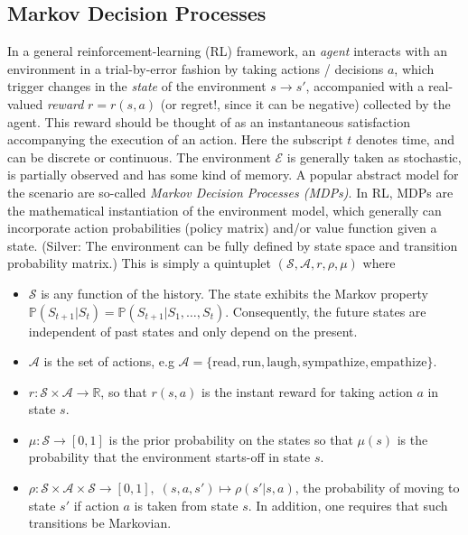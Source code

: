 \documentclass{article} %
\begin{document}
\subsection{Markov Decision Processes}
In a general reinforcement-learning (RL) framework, an \textit{agent}
interacts with an  environment in a trial-by-error fashion by taking
actions / decisions $a$, which trigger changes in the
\textit{state} of the environment
$s \rightarrow s'$, accompanied with a real-valued \textit{reward}
$r = r(s, a)$ (or regret!, since it can be negative) collected by the
agent. This reward should be thought
of as an instantaneous satisfaction accompanying the execution of
an action. Here the subscript $t$ denotes time, and can be discrete or
continuous.
The environment $\mathcal E$ is generally taken as stochastic,
is partially observed and 
has some kind of memory.
A popular abstract model for the scenario are so-called \textit{Markov Decision Processes (MDPs)}.
In RL, MDPs are the mathematical instantiation of the environment model,
which generally can incorporate action probabilities (policy matrix)
and/or value function given a state.
(Silver: The environment can be fully defined by state space and
transition probability matrix.)
This is simply a quintuplet $(\mathcal S, \mathcal A, r, \rho, \mu)$ where
\begin{itemize}
\item $\mathcal S$ is any function of the history.
The state exhibits the Markov property
$\mathbb{P}(S_{t+1}|S_{t})=\mathbb{P}(S_{t+1}|S_{1}, \dots, S_{t})$.
Consequently, the future states are independent of past states and only depend on the present.
\item $\mathcal A$ is the set of actions, e.g $\mathcal A = \{\text{read}, \text{run},
  \text{laugh}, \text{sympathize}, \text{empathize}\}.$
\item $r : \mathcal S \times \mathcal A \rightarrow \mathbb R$, so that $r(s, a)$ is the instant reward for taking action $a$ in state $s$.
\item $\mu: \mathcal S \rightarrow [0, 1]$ is the prior probability on the states so that
  $\mu(s)$ is the probability that the environment starts-off in state $s$.
  \item $\rho : \mathcal S \times \mathcal A \times \mathcal S \rightarrow [0, 1],\; (s,a,s') \mapsto \rho(s'|s,a)$, the probability of moving to state $s'$ if action $a$ is taken from state $s$. In addition, one requires that such transitions be Markovian.
\end{itemize}
\end{document}
